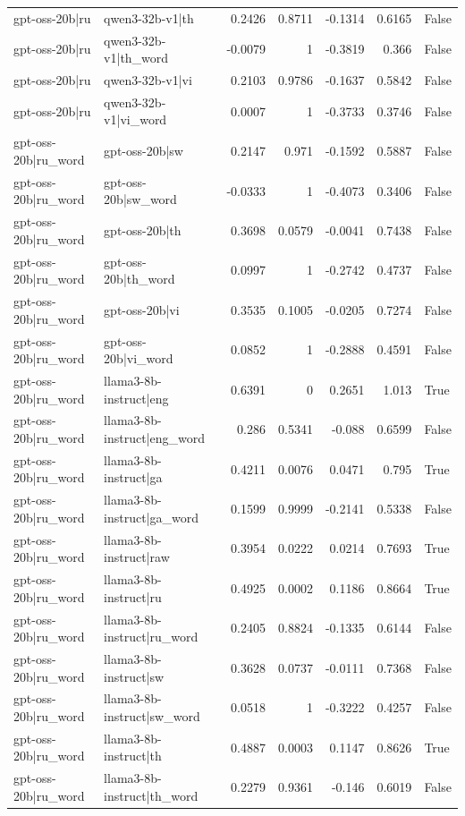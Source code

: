 \begin{table}
\begin{tabular}{l l r r r r l}
gpt-oss-20b|ru & qwen3-32b-v1|th & 0.2426 & 0.8711 & -0.1314 & 0.6165 & False \\
gpt-oss-20b|ru & qwen3-32b-v1|th_word & -0.0079 & 1 & -0.3819 & 0.366 & False \\
gpt-oss-20b|ru & qwen3-32b-v1|vi & 0.2103 & 0.9786 & -0.1637 & 0.5842 & False \\
gpt-oss-20b|ru & qwen3-32b-v1|vi_word & 0.0007 & 1 & -0.3733 & 0.3746 & False \\
gpt-oss-20b|ru_word & gpt-oss-20b|sw & 0.2147 & 0.971 & -0.1592 & 0.5887 & False \\
gpt-oss-20b|ru_word & gpt-oss-20b|sw_word & -0.0333 & 1 & -0.4073 & 0.3406 & False \\
gpt-oss-20b|ru_word & gpt-oss-20b|th & 0.3698 & 0.0579 & -0.0041 & 0.7438 & False \\
gpt-oss-20b|ru_word & gpt-oss-20b|th_word & 0.0997 & 1 & -0.2742 & 0.4737 & False \\
gpt-oss-20b|ru_word & gpt-oss-20b|vi & 0.3535 & 0.1005 & -0.0205 & 0.7274 & False \\
gpt-oss-20b|ru_word & gpt-oss-20b|vi_word & 0.0852 & 1 & -0.2888 & 0.4591 & False \\
gpt-oss-20b|ru_word & llama3-8b-instruct|eng & 0.6391 & 0 & 0.2651 & 1.013 & True \\
gpt-oss-20b|ru_word & llama3-8b-instruct|eng_word & 0.286 & 0.5341 & -0.088 & 0.6599 & False \\
gpt-oss-20b|ru_word & llama3-8b-instruct|ga & 0.4211 & 0.0076 & 0.0471 & 0.795 & True \\
gpt-oss-20b|ru_word & llama3-8b-instruct|ga_word & 0.1599 & 0.9999 & -0.2141 & 0.5338 & False \\
gpt-oss-20b|ru_word & llama3-8b-instruct|raw & 0.3954 & 0.0222 & 0.0214 & 0.7693 & True \\
gpt-oss-20b|ru_word & llama3-8b-instruct|ru & 0.4925 & 0.0002 & 0.1186 & 0.8664 & True \\
gpt-oss-20b|ru_word & llama3-8b-instruct|ru_word & 0.2405 & 0.8824 & -0.1335 & 0.6144 & False \\
gpt-oss-20b|ru_word & llama3-8b-instruct|sw & 0.3628 & 0.0737 & -0.0111 & 0.7368 & False \\
gpt-oss-20b|ru_word & llama3-8b-instruct|sw_word & 0.0518 & 1 & -0.3222 & 0.4257 & False \\
gpt-oss-20b|ru_word & llama3-8b-instruct|th & 0.4887 & 0.0003 & 0.1147 & 0.8626 & True \\
gpt-oss-20b|ru_word & llama3-8b-instruct|th_word & 0.2279 & 0.9361 & -0.146 & 0.6019 & False \\

\end{tabular}
\end{table}
